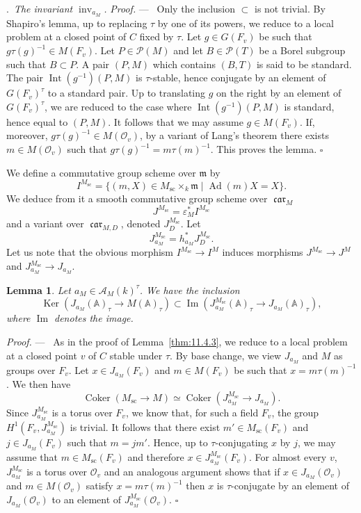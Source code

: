 \documentclass[12pt,a4paper,oneside,english,leqno]{smfart}
\makeatletter
\numberwithin{equation}{subsection}
\newcounter{theo}
\numberwithin{theo}{subsection}
\newenvironment{paragr}[1][]{\medskip\refstepcounter{subsection}%
  \par\noindent\hspace*{\parindent}\thesubsection.\ \emph{#1}%
  \@ifundefined{@empty}{}{}\ignorespaces}{\medskip}
\theoremstyle{plain}
\newtheorem{lemma}[theo]{Lemma}
\theoremstyle{definition}
\theoremstyle{remark}
\newenvironment{preuve}[1][]{\medskip\noindent\textit{Proof.} #1 ---\ }%
  {\hfill\ensuremath{\square}\medskip}
\DeclareMathOperator{\Ad}{Ad}
\DeclareMathOperator{\scnx}{sc}
\DeclareMathOperator{\inv}{inv}
\DeclareMathOperator{\Int}{Int}
\DeclareMathOperator{\Ker}{Ker}
\DeclareMathOperator{\Coker}{Coker}
\DeclareMathOperator{\car}{\mathfrak{car}}
\newcommand{\AAA}{\mathbb{A}}
\newcommand{\oc}{\mathcal{O}}
\newcommand{\pc}{\mathcal{P}}
\newcommand{\Ac}{\mathcal{A}}
\newcommand{\mgo}{\mathfrak{m}}
\makeatother
\begin{document}
\begin{paragr}[The invariant $\inv_{a_M}$.]
\begin{preuve}
Only the inclusion $\subset$ is not trivial. By Shapiro's lemma, up to replacing $\tau$ by one of its powers, we reduce to a local problem at a closed point of $C$ fixed by $\tau$. Let $g\in G(F_v)$ be such that $g\tau(g)^{-1}\in M(F_v)$. Let $P\in\pc(M)$ and let $B\in\pc(T)$ be a Borel subgroup such that $B\subset P$. A pair $(P,M)$ which contains $(B,T)$ is said to be standard. The pair $\Int(g^{-1})(P,M)$ is $\tau$-stable, hence conjugate by an element of $G(F_v)^\tau$ to a standard pair. Up to translating $g$ on the right by an element of $G(F_v)^\tau$, we are reduced to the case where $\Int(g^{-1})(P,M)$ is standard, hence equal to $(P,M)$. It follows that we may assume $g\in M(F_v)$. If, moreover, $g\tau(g)^{-1}\in M(\oc_v)$, by a variant of Lang's theorem there exists $m\in M(\oc_v)$ such that $g\tau(g)^{-1}=m\tau(m)^{-1}$. This proves the lemma.
\end{preuve}

We define a commutative group scheme over $\mgo$ by
$$
I^{M_{\scnx}}=\{(m,X)\in M_{\scnx}\times_k\mgo\mid\Ad(m)X=X\}.
$$
We deduce from it a smooth commutative group scheme over $\car_M$
$$
J^{M_{\scnx}}=\varepsilon_M^*I^{M_{\scnx}}
$$
and a variant over $\car_{M,D}$, denoted $J_D^{M_{\scnx}}$. Let
$$
J_{a_M}^{M_{\scnx}}=h_{a_M}^*J_D^{M_{\scnx}}.
$$
Let us note that the obvious morphism $I^{M_{\scnx}}\to I^M$ induces morphisms $J^{M_{\scnx}}\to J^M$ and $J_{a_M}^{M_{\scnx}}\to J_{a_M}$.

\begin{lemma}\label{thm:11.4.4}
Let $a_M\in\Ac_M(k)^\tau$. We have the inclusion
$$
\Ker(J_{a_M}(\AAA)_\tau\to M(\AAA)_\tau)\subset \operatorname{Im}(J_{a_M}^{M_{\scnx}}(\AAA)_\tau\to J_{a_M}(\AAA)_\tau),
$$
where $\operatorname{Im}$ denotes the image.
\end{lemma}

\begin{preuve}
As in the proof of Lemma~\ref{thm:11.4.3}, we reduce to a local problem at a closed point $v$ of $C$ stable under $\tau$. By base change, we view $J_{a_M}$ and $M$ as groups over $F_v$. Let $x\in J_{a_M}(F_v)$ and $m\in M(F_v)$ be such that $x=m\tau(m)^{-1}$. We then have
$$
\Coker(M_{\scnx}\to M)\simeq\Coker(J_{a_M}^{M_{\scnx}}\to J_{a_M}).
$$
Since $J_{a_M}^{M_{\scnx}}$ is a torus over $F_v$, we know that, for such a field $F_v$, the group $H^1(F_v,J_{a_M}^{M_{\scnx}})$ is trivial. It follows that there exist $m'\in M_{\scnx}(F_v)$ and $j\in J_{a_M}(F_v)$ such that $m=jm'$. Hence, up to $\tau$-conjugating $x$ by $j$, we may assume that $m\in M_{\scnx}(F_v)$ and therefore $x\in J_{a_M}^{M_{\scnx}}(F_v)$. For almost every $v$, $J_{a_M}^{M_{\scnx}}$ is a torus over $\oc_v$ and an analogous argument shows that if $x\in J_{a_M}(\oc_v)$ and $m\in M(\oc_v)$ satisfy $x=m\tau(m)^{-1}$ then $x$ is $\tau$-conjugate by an element of $J_{a_M}(\oc_v)$ to an element of $J_{a_M}^{M_{\scnx}}(\oc_v)$.
\end{preuve}


\end{paragr}
\end{document}

